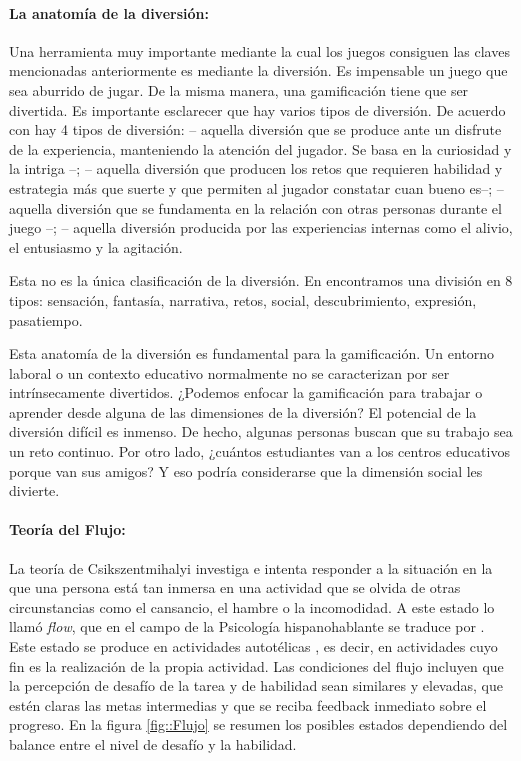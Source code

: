 \paragraph{La anatomía de la diversión: }

Una herramienta muy importante mediante la cual los juegos consiguen las claves mencionadas anteriormente es mediante la diversión.
%
Es impensable un juego que sea aburrido de jugar.
%
De la misma manera, una gamificación tiene que ser divertida.
%
Es importante esclarecer que hay varios tipos de diversión.
%
De acuerdo con \cite{whyweplaygames} hay 4 tipos de diversión: 
%
 -- aquella diversión que se produce ante un disfrute de la experiencia, manteniendo la atención del jugador. Se basa en la curiosidad y la intriga --;
%
\label{kindsoffun}
  -- aquella diversión que producen los retos que requieren habilidad y estrategia más que suerte y que permiten al jugador constatar cuan bueno es--;
%
 -- aquella diversión que se fundamenta en la relación con otras personas durante el juego --;
%
 -- aquella diversión producida por las experiencias internas como el alivio, el entusiasmo y la agitación.

Esta no es la única clasificación de la diversión.
%
En \cite{MDA} encontramos una división en 8 tipos: sensación, fantasía, narrativa, retos, social, descubrimiento, expresión, pasatiempo.
%
\label{AnatomyOfFun}
%

Esta anatomía de la diversión es fundamental para la gamificación.
%
Un entorno laboral o un contexto educativo normalmente no se caracterizan por ser intrínsecamente divertidos.
%
¿Podemos enfocar la gamificación para trabajar o aprender desde alguna de las dimensiones de la diversión? 
%
El potencial de la diversión difícil es inmenso. 
%
De hecho, algunas personas buscan que su trabajo sea un reto continuo.
%
Por otro lado, ¿cuántos estudiantes van a los centros educativos porque van sus amigos?
%
Y eso podría considerarse que la dimensión social les divierte.


\paragraph{Teoría del Flujo:} La teoría de Csikszentmihalyi investiga e intenta responder a la situación en la que una persona está tan inmersa en una actividad que se olvida de otras circunstancias como el cansancio, el hambre o la incomodidad.
%
A este estado lo llamó \textit{flow}, que en el campo de la Psicología hispanohablante se traduce por .
%
Este estado se produce en actividades autotélicas \label{autotel}, es decir, en actividades cuyo fin es la realización de la propia actividad.
%
Las condiciones del flujo incluyen que la percepción de desafío de la tarea y de habilidad sean similares y elevadas, que estén claras las metas intermedias y que se reciba feedback inmediato sobre el progreso\cite{Flow}.
%
En la figura \ref{fig::Flujo} se resumen los posibles estados dependiendo del balance entre el nivel de desafío y la habilidad.


